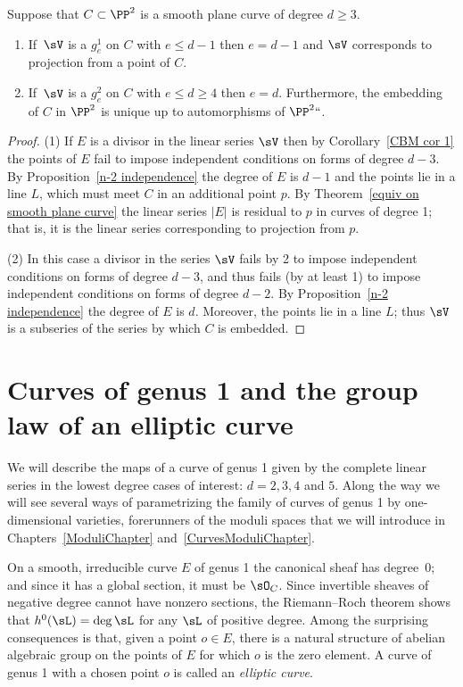 \begin{corollary}\label{CBM cor 2}
 Suppose that $C\subset \PP^2$ is a smooth plane curve of degree $d\geq 3$.

\begin{enumerate}
 \item If $\,\sV$ is a $g^1_e$ on $C$ with $e\leq d-1$ then $e = d-1$ and $\sV$
 corresponds to projection from a point of $C$.
 \item If $\,\sV$ is a $g^2_e$ on $C$ with $e\leq d \geq 4$ then $e = d$. Furthermore,  the
  embedding of $C$ in $\PP^2$ is unique up to automorphisms of $\PP^2` `$.
 \end{enumerate}
\end{corollary}

\begin{proof}
(1) If $E$ is a divisor in the linear series $\sV$ then by Corollary~\ref{CBM cor 1} the points of $E$ fail to impose
 independent conditions on forms of degree $d-3$. By Proposition~\ref{n-2 independence} the degree of $E$ is $d-1$
 and the points lie in a line $L$, which must meet $C$ in an additional point $p$. By Theorem~\ref{equiv on smooth plane curve}
 the linear series $|E|$ is residual to $p$ in curves of degree 1; that is, it is the linear series corresponding to projection from $p$.

(2) In this case a divisor in the series $\sV$ fails by 2 to impose independent conditions on forms of degree $d-3$, and
 thus fails (by at least 1) to impose independent conditions on forms of degree $d-2$. By
  Proposition~\ref{n-2 independence} the degree of $E$ is $d$.
 Moreover, the points lie in a line $L$; thus $\sV$ is a subseries of the series by which $C$ is embedded.
 \end{proof}

\section{Curves of genus 1 and the group law of an elliptic curve}

We will describe the maps of a curve of genus 1 given by
the complete linear series in the lowest degree cases of interest: $d =  2, 3, 4$ and $5$. Along the
way we will see several ways of parametrizing the family of curves of genus 1 by one-dimensional varieties,
%
forerunners of the moduli spaces that we will introduce in Chapters~\ref{ModuliChapter} and~\ref{CurvesModuliChapter}.


On a smooth, irreducible curve $E$ of genus 1 the canonical sheaf has degree~0;
and since it has a
%
global section,
it must be $\sO_C$.
Since invertible sheaves of negative degree cannot have
nonzero sections,
the Riemann--Roch theorem
%
shows that
$h^0( \sL) = \deg \sL$ for any $\sL$ of positive degree. Among the surprising consequences is that, given
%
a point $o\in E$, there is a natural structure of abelian algebraic group on the points of $E$ for which $o$
is the zero element. A curve of genus 1 with a chosen point $o$ is called an \emph{elliptic curve}.
%

